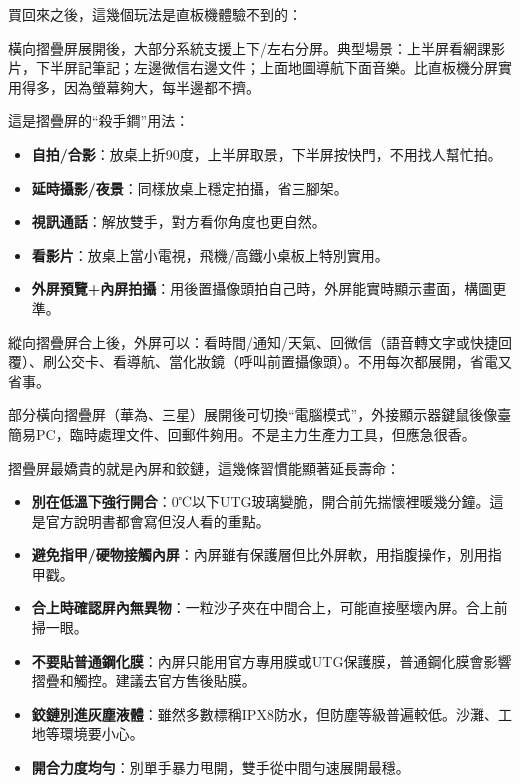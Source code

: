 
買回來之後，這幾個玩法是直板機體驗不到的：


橫向摺疊屏展開後，大部分系統支援上下/左右分屏。典型場景：上半屏看網課影片，下半屏記筆記；左邊微信右邊文件；上面地圖導航下面音樂。比直板機分屏實用得多，因為螢幕夠大，每半邊都不擠。


這是摺疊屏的“殺手鐧”用法：

\begin{itemize}
  \item \textbf{自拍/合影}：放桌上折90度，上半屏取景，下半屏按快門，不用找人幫忙拍。
  \item \textbf{延時攝影/夜景}：同樣放桌上穩定拍攝，省三腳架。
  \item \textbf{視訊通話}：解放雙手，對方看你角度也更自然。
  \item \textbf{看影片}：放桌上當小電視，飛機/高鐵小桌板上特別實用。
  \item \textbf{外屏預覽+內屏拍攝}：用後置攝像頭拍自己時，外屏能實時顯示畫面，構圖更準。
\end{itemize}


縱向摺疊屏合上後，外屏可以：看時間/通知/天氣、回微信（語音轉文字或快捷回覆）、刷公交卡、看導航、當化妝鏡（呼叫前置攝像頭）。不用每次都展開，省電又省事。


部分橫向摺疊屏（華為、三星）展開後可切換“電腦模式”，外接顯示器鍵鼠後像臺簡易PC，臨時處理文件、回郵件夠用。不是主力生產力工具，但應急很香。


摺疊屏最嬌貴的就是內屏和鉸鏈，這幾條習慣能顯著延長壽命：

\begin{itemize}
  \item \textbf{別在低溫下強行開合}：0℃以下UTG玻璃變脆，開合前先揣懷裡暖幾分鐘。這是官方說明書都會寫但沒人看的重點。
  \item \textbf{避免指甲/硬物接觸內屏}：內屏雖有保護層但比外屏軟，用指腹操作，別用指甲戳。
  \item \textbf{合上時確認屏內無異物}：一粒沙子夾在中間合上，可能直接壓壞內屏。合上前掃一眼。
  \item \textbf{不要貼普通鋼化膜}：內屏只能用官方專用膜或UTG保護膜，普通鋼化膜會影響摺疊和觸控。建議去官方售後貼膜。
  \item \textbf{鉸鏈別進灰塵液體}：雖然多數標稱IPX8防水，但防塵等級普遍較低。沙灘、工地等環境要小心。
  \item \textbf{開合力度均勻}：別單手暴力甩開，雙手從中間勻速展開最穩。
\end{itemize}

